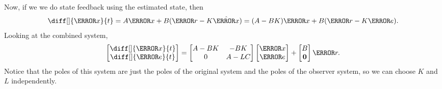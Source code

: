 Now, if we we do state feedback using the estimated state, then
\[
  \diff[]{\V{x}}{t} = A\V{x}+B(\V{r}-K\hat{\V{x}}) = (A-BK)\V{x}+B(\V{r}-K\V{e}).
\]
Looking at the combined system,
\[
  \begin{bmatrix} \diff[]{\V{x}}{t} \\ \diff[]{\V{e}}{t} \end{bmatrix}
  = \begin{bmatrix} A-BK & -BK \\ 0 & A-LC \end{bmatrix} \begin{bmatrix} \V{x} \\ \V{e} \end{bmatrix}
  + \begin{bmatrix} B \\ \bs{0} \end{bmatrix}\V{r}.
\]
Notice that the poles of this system are just the poles of the original system and the poles of the observer system, so we can choose $K$ and $L$ independently.
